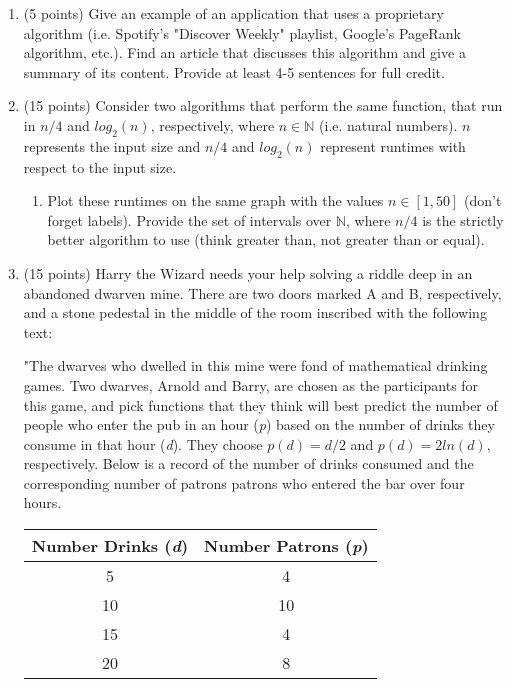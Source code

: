 \documentclass[12pt]{article}
\begin{document}
\begin{enumerate}


	\item	(5 points) Give an example of an application that uses a proprietary algorithm (i.e. Spotify's "Discover Weekly" playlist, Google's PageRank algorithm, etc.).  Find an article that discusses this algorithm and give a summary of its content.  Provide at least 4-5 sentences for full credit.

	\newpage

	\item (15 points) Consider two algorithms that perform the same function, that run in  $n/4$ and $log_{2}(n)$, respectively, where $n \in \mathbb{N}$ (i.e. natural numbers). $n$ represents the input size and $n/4$ and $log_{2}(n)$ represent runtimes with respect to the input size.

	\begin{enumerate}

	\item \label{stocks:a} Plot these runtimes on the same graph with the values $n \in [1,50]$ (don't forget labels). Provide the set of intervals over $\mathbb{N}$, where $n/4$ is the strictly better algorithm to use (think greater than, not greater than or equal).

	\end{enumerate}

	\newpage

	\item (15 points) Harry the Wizard needs your help solving a riddle deep in an abandoned dwarven mine. There are two doors marked A and B, respectively, and a stone pedestal in the middle of the room inscribed with the following text:

    \scriptsize

    "The dwarves who dwelled in  this mine were fond of mathematical drinking games. Two dwarves, Arnold and Barry, are chosen as the participants for this game, and pick functions that they think will best predict the number of people who enter the pub in an hour (\textit{p}) based on the number of drinks they consume in that hour (\textit{d}). They choose $p(d) = d/2$ and $p(d)= 2ln(d)$, respectively. Below is a record of the number of drinks consumed and the corresponding number of patrons patrons who entered the bar over four hours.

    \begin{center}
        \begin{tabular}{|c | c |}
        \hline
        Number Drinks (\textit{d}) & Number Patrons (\textit{p})\\ \hline
        5 & 4  \\ \hline
        10 & 10  \\ \hline
        15 & 4  \\ \hline
        20 & 8  \\ \hline


\end{tabular}
\end{center}
\end{enumerate}
\end{document}
